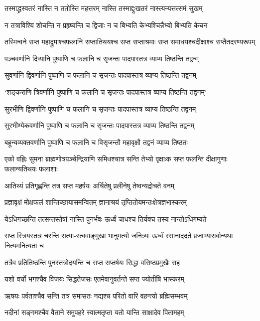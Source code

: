 \twolineshloka
{तस्माद्ध्रस्वतरं नास्ति न ततोस्ति महत्तरम्}
{नास्ति तस्माद्दुःखतरं नास्त्यन्यत्तत्समं सुखम्}


\twolineshloka
{न तत्राविश्यि शोचन्ति न प्रहृष्यन्ति च द्विजाः}
{न च बिभ्यति केभ्यश्चिन्नैभ्यो बिभ्यति केचन}


\twolineshloka
{तस्मिन्वने सप्त महाद्रुमाश्चफलानि सप्तातिथयश्च सप्त}
{सप्ताश्रमाः सप्त समाधयश्चदीक्षाश्च सप्तैतदरण्यरूपम्}


\twolineshloka
{पञ्चवर्णानि दिव्यानि पुष्पाणि च फलानि च}
{सृजन्तः पादपास्तत्र व्याप्य तिष्ठन्ति तद्वन्म्}


\twolineshloka
{सुवर्णानि द्विवर्णानि पुष्पाणि च फलानि च}
{सृजन्तः पादपास्तत्र व्याप्य तिष्ठन्ति तद्वनम्}


\twolineshloka
{`शङ्कराणि त्रिवर्णानि पुष्पाणि च फलानि च}
{सृजन्तः पादपास्तत्र व्याप्य तिष्ठन्ति तद्वनम्'}


\twolineshloka
{सुरभीणि द्विवर्णानि पुष्पाणि च फलानि च}
{सृजन्तः पादपास्तत्र व्याप्य तिष्ठन्ति तद्वनम्}


\twolineshloka
{सुरभीण्येकवर्णानि पुष्पाणि च फलानि च}
{सृजन्तः पादपास्तत्र व्याप्य तिष्ठन्ति तद्वनम्}


\twolineshloka
{बहून्यव्यक्तवर्णानि पुष्पाणि च फलानि च}
{विसृजन्तौ महावृक्षौ तद्वनं व्याप्य तिष्ठतः}


\twolineshloka
{एको वह्निः सुमना ब्राह्मणोत्रपञ्चेन्द्रियाणि समिधश्चात्र सन्ति}
{तेभ्यो वृक्षाःक सप्त फलन्ति दीक्षागुणाः फलान्यतिथयः फलाशाः}


\twolineshloka
{आतिथ्यं प्रतिगृह्णन्ति तत्र सप्त महर्षयः}
{अर्चितेषु प्रलीनेषु तेष्वन्यद्रोचते वनम्}


\twolineshloka
{प्रज्ञावृक्षं मोक्षफलं शान्तिच्छायासमन्वितम्}
{ज्ञानाश्रयं तृप्तितोयमन्तःक्षेत्रज्ञभास्करम्}


\twolineshloka
{येऽधिगच्छन्ति तत्सन्तस्तेषां नास्ति पुनर्भवः}
{ऊर्ध्वं चाधश्च तिर्यक्च तस्य नान्तोऽधिगम्यते}


\twolineshloka
{सप्त स्त्रियस्तत्र चरन्ति सत्या-स्त्ववाङ्मुखा भानुमत्यो जनित्र्यः}
{ऊर्ध्वं रसानाददते प्रजाभ्यःसर्वान्यथा नित्यमनित्यता च}


\twolineshloka
{तत्रैव प्रतितिष्ठन्ति पुनस्तत्रोदयन्ति च}
{सप्त सप्तर्षयः सिद्धा वसिष्ठप्रमुखैः सह}


\twolineshloka
{यशो वर्चो भगश्चैव विजयः सिद्धतेजसः}
{एतमेवानुवर्तन्ते सप्त ज्योतींषि भास्करम्}


\twolineshloka
{ऋषयः पर्वताश्चैव सन्ति तत्र समासतः}
{नद्यश्च परितो वारि वहन्त्यो ब्रह्मिसम्भवम्}


\twolineshloka
{नदीनां सङ्गमश्चैव वैताने समुपहरे}
{स्वात्मतृप्ता यतो यान्ति साक्षादेव पितामहम्}


